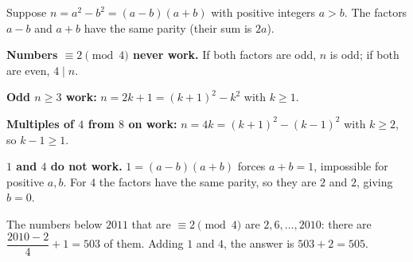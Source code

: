 Suppose $n=a^2-b^2=(a-b)(a+b)$ with positive integers $a>b$. The factors $a-b$ and $a+b$ have the same parity (their sum is $2a$).

\textbf{Numbers $\equiv2\pmod4$ never work.} If both factors are odd, $n$ is odd; if both are even, $4\mid n$.

\textbf{Odd $n\ge3$ work:} $n=2k+1=(k+1)^2-k^2$ with $k\ge1$.

\textbf{Multiples of $4$ from $8$ on work:} $n=4k=(k+1)^2-(k-1)^2$ with $k\ge2$, so $k-1\ge1$.

\textbf{$1$ and $4$ do not work.} $1=(a-b)(a+b)$ forces $a+b=1$, impossible for positive $a,b$. For $4$ the factors have the same parity, so they are $2$ and $2$, giving $b=0$.

The numbers below $2011$ that are $\equiv2\pmod4$ are $2,6,\dots,2010$: there are $\dfrac{2010-2}{4}+1=503$ of them. Adding $1$ and $4$, the answer is $503+2=\boxed{505}$.
